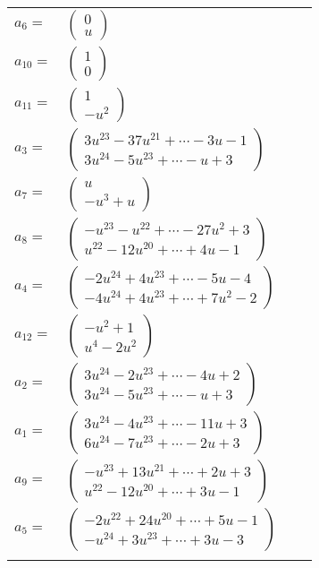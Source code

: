 \documentclass[1p]{elsarticle_modified}
\theoremstyle{definition}
\begin{document}
\begin{tabular}{m{7pt} m{180pt} m{7pt} m{180pt} }
\flushright $a_{6}=$&$\begin{pmatrix}0\\u\end{pmatrix}$ \\
\flushright $a_{10}=$&$\begin{pmatrix}1\\0\end{pmatrix}$ \\
\flushright $a_{11}=$&$\begin{pmatrix}1\\- u^2\end{pmatrix}$ \\
\flushright $a_{3}=$&$\begin{pmatrix}3 u^{23}-37 u^{21}+\cdots-3 u-1\\3 u^{24}-5 u^{23}+\cdots- u+3\end{pmatrix}$ \\
\flushright $a_{7}=$&$\begin{pmatrix}u\\- u^3+u\end{pmatrix}$ \\
\flushright $a_{8}=$&$\begin{pmatrix}- u^{23}- u^{22}+\cdots-27 u^2+3\\u^{22}-12 u^{20}+\cdots+4 u-1\end{pmatrix}$ \\
\flushright $a_{4}=$&$\begin{pmatrix}-2 u^{24}+4 u^{23}+\cdots-5 u-4\\-4 u^{24}+4 u^{23}+\cdots+7 u^2-2\end{pmatrix}$ \\
\flushright $a_{12}=$&$\begin{pmatrix}- u^2+1\\u^4-2 u^2\end{pmatrix}$ \\
\flushright $a_{2}=$&$\begin{pmatrix}3 u^{24}-2 u^{23}+\cdots-4 u+2\\3 u^{24}-5 u^{23}+\cdots- u+3\end{pmatrix}$ \\
\flushright $a_{1}=$&$\begin{pmatrix}3 u^{24}-4 u^{23}+\cdots-11 u+3\\6 u^{24}-7 u^{23}+\cdots-2 u+3\end{pmatrix}$ \\
\flushright $a_{9}=$&$\begin{pmatrix}- u^{23}+13 u^{21}+\cdots+2 u+3\\u^{22}-12 u^{20}+\cdots+3 u-1\end{pmatrix}$ \\
\flushright $a_{5}=$&$\begin{pmatrix}-2 u^{22}+24 u^{20}+\cdots+5 u-1\\- u^{24}+3 u^{23}+\cdots+3 u-3\end{pmatrix}$\\&\end{tabular}
\end{document}
